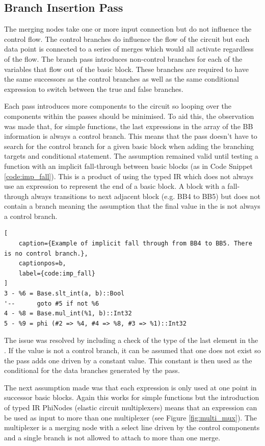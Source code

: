 \subsection{Branch Insertion Pass}
The merging nodes take one or more input connection but do not influence the control flow. The control branches do influence the flow of the circuit but each data point is connected to a series of merges which would all activate regardless of the flow. The branch pass introduces non-control branches for each of the variables that flow out of the basic block. These branches are required to have the same successors as the control branches as well as the same conditional expression to switch between the true and false branches. 

Each pass introduces more components to the circuit so looping over the components within the passes should be minimised. To aid this, the observation was made that, for simple functions, the last expressions in the  array of the BB information is always a control branch. This means that the pass doesn't have to search for the control branch for a given basic block when adding the branching targets and conditional statement. The assumption remained valid until testing a function with an implicit fall-through between basic blocks (as in Code Snippet \ref{code:imp_fall}). This is a product of using the typed IR which does not always use an expression to represent the end of a basic block. A block with a fall-through always transitions to next adjacent block (e.g. BB4 to BB5) but does not contain a branch meaning the assumption that the final value in the  is not always a control branch. 

\begin{lstlisting}[
    caption={Example of implicit fall through from BB4 to BB5. There is no control branch.},
    captionpos=b, 
    label={code:imp_fall}
]
3 - %6 = Base.slt_int(a, b)::Bool
'--      goto #5 if not %6
4 - %8 = Base.mul_int(%1, b)::Int32
5 - %9 = phi (#2 => %4, #4 => %8, #3 => %1)::Int32
\end{lstlisting}

The issue was resolved by including a check of the type of the last element in the . If the value is not a control branch, it can be assumed that one does not exist so the pass adds one driven by a constant value. This constant is then used as the conditional for the data branches generated by the pass.

The next assumption made was that each expression is only used at one point in successor basic blocks. Again this works for simple functions but the introduction of typed IR PhiNodes (elastic circuit multiplexers) means that an expression can be used as input to more than one multiplexer (see Figure \ref{fig:multi_mux}). The multiplexer is a merging node with a select line driven by the control components and a single branch is not allowed to attach to more than one merge. 

